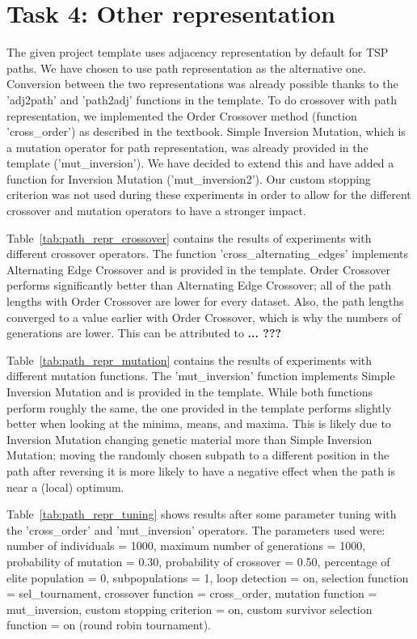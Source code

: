 \documentclass{report}
\begin{document}
\section{Task 4: Other representation}
The given project template uses adjacency representation by default for TSP paths. We have chosen to use path representation as the alternative one. Conversion between the two representations was already possible thanks to the 'adj2path' and 'path2adj' functions in the template. To do crossover with path representation, we implemented the Order Crossover method (function 'cross\_order') as described in the textbook. Simple Inversion Mutation, which is a mutation operator for path representation, was already provided in the template ('mut\_inversion'). We have decided to extend this and have added a function for Inversion Mutation ('mut\_inversion2'). Our custom stopping criterion was not used during these experiments in order to allow for the different crossover and mutation operators to have a stronger impact.

Table~\ref{tab:path_repr_crossover} contains the results of experiments with different crossover operators. The function 'cross\_alternating\_edges' implements Alternating Edge Crossover and is provided in the template. Order Crossover performs significantly better than Alternating Edge Crossover; all of the path lengths with Order Crossover are lower for every dataset. Also, the path lengths converged to a value earlier with Order Crossover, which is why the numbers of generations are lower. This can be attributed to \textbf{... ???}


Table~\ref{tab:path_repr_mutation} contains the results of experiments with different mutation functions. The 'mut\_inversion' function implements Simple Inversion Mutation and is provided in the template. While both functions perform roughly the same, the one provided in the template performs slightly better when looking at the minima, means, and maxima. This is likely due to Inversion Mutation changing genetic material more than Simple Inversion Mutation; moving the randomly chosen subpath to a different position in the path after reversing it is more likely to have a negative effect when the path is near a (local) optimum. 


Table~\ref{tab:path_repr_tuning} shows results after some parameter tuning with the 'cross\_order' and 'mut\_inversion' operators. The parameters used were: number of individuals = 1000, maximum number of generations = 1000, probability of mutation = 0.30, probability of crossover = 0.50, percentage of elite population = 0, subpopulations = 1, loop detection = on, selection function = sel\_tournament, crossover function = cross\_order, mutation function = mut\_inversion, custom stopping criterion = on, custom survivor selection function = on (round robin tournament).

\end{document}
